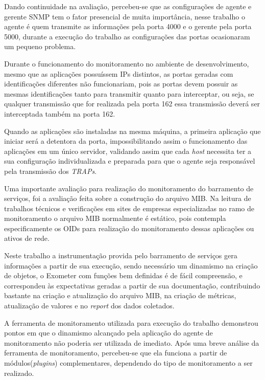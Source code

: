 Dando continuidade na avaliação, percebeu-se que as configurações de agente e gerente \acrshort{SNMP} tem o fator presencial de muita importância, nesse trabalho o agente é quem transmite as informações pela porta 4000 e o gerente pela porta 5000, durante a execução do trabalho as configurações das portas ocasionaram um pequeno problema. 

Durante o funcionamento do monitoramento no ambiente de desenvolvimento, mesmo que as aplicações possuíssem \acrshort{IP}s distintos, as portas geradas com identificações diferentes não funcionariam, pois as portas devem possuir as mesmas identificações tanto para transmitir quanto para interceptar, ou seja, se qualquer transmissão que for realizada pela porta 162 essa transmissão deverá ser interceptada também na porta 162. 

Quando as aplicações são instaladas na mesma máquina, a primeira aplicação que iniciar será a detentora da porta, impossibilitando assim o funcionamento das aplicações em um único servidor, validando assim que cada \textit{host} necessita ter a sua configuração individualizada e preparada para que o agente seja responsável pela transmissão dos \textit{TRAPs}. 

Uma importante avaliação para realização do monitoramento do barramento de serviços, foi a avaliação feita sobre a construção do arquivo MIB. Na leitura de trabalhos técnicos e verificações em sites de empresas especializadas no ramo de monitoramento o arquivo MIB normalmente é estático, pois contempla especificamente os \acrshort{OID}s para realização do monitoramento dessas aplicações ou ativos de rede. 

Neste trabalho a instrumentação provida pelo barramento de serviços gera informações a partir de sua execução, sendo necessário um dinamismo na criação de objetos, o Exometer com funções bem definidas é de fácil compreensão, e correspondeu às expectativas geradas a partir de sua documentação, contribuindo bastante na criação e atualização do arquivo MIB, na criação de métricas, atualização de valores e no \textit{report} dos dados coletados.  

A ferramenta de monitoramento utilizada para execução do trabalho demonstrou pontos em que o dinamismo alcançado pela aplicação do agente de monitoramento não poderia ser utilizada de imediato. Após uma breve análise da ferramenta de monitoramento, percebeu-se que ela funciona a partir de módulos(\textit{plugins}) complementares, dependendo do tipo de monitoramento a ser realizado. 

